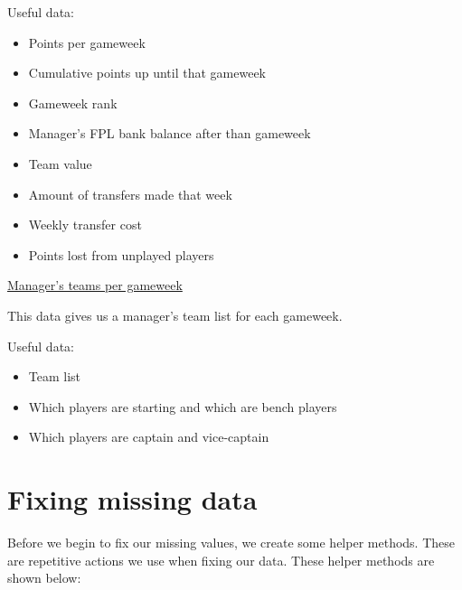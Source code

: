 \documentclass[12pt, a4paper, oneside]{book}
\numberwithin{equation}{section}
\begin{document}
Useful data:

\begin{itemize}
  \item Points per gameweek
  \item Cumulative points up until that gameweek
  \item Gameweek rank
  \item Manager's FPL bank balance after than gameweek
  \item Team value
  \item Amount of transfers made that week
  \item Weekly transfer cost
  \item Points lost from unplayed players
\end{itemize}

\vspace{0.5cm}

\href{https://fantasy.premierleague.com/api/entry/123456/event/1/picks/}{Manager's teams per gameweek}

\vspace{0.5cm}

This data gives us a manager's team list for each gameweek.

\vspace{0.5cm}

Useful data:

\begin{itemize}
  \item Team list
  \item Which players are starting and which are bench players
  \item Which players are captain and vice-captain
\end{itemize}

\section{Fixing missing data}\label{sec:4.2}

Before we begin to fix our missing values, we create some helper methods. These are repetitive actions we use when fixing our data. These helper methods are shown below:
\end{document}
